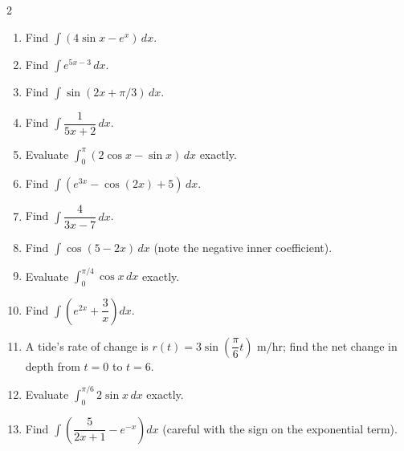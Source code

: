 \documentclass[11pt]{article}
\begin{document}
\begin{recapbox}
\begin{multicols}{2}
\small
\begin{enumerate}[leftmargin=*,itemsep=3pt]
  \item Find $\displaystyle\int(4\sin x-e^x)\,dx$.
  \item Find $\displaystyle\int e^{5x-3}\,dx$.
  \item Find $\displaystyle\int\sin(2x+\pi/3)\,dx$.
  \item Find $\displaystyle\int\dfrac{1}{5x+2}\,dx$.
  \item Evaluate $\displaystyle\int_0^{\pi}(2\cos x-\sin x)\,dx$ exactly.
  \item Find $\displaystyle\int(e^{3x}-\cos(2x)+5)\,dx$.
  \item Find $\displaystyle\int\dfrac{4}{3x-7}\,dx$.
  \item Find $\displaystyle\int\cos(5-2x)\,dx$ (note the negative inner coefficient).
  \item Evaluate $\displaystyle\int_0^{\pi/4}\cos x\,dx$ exactly.
  \item Find $\displaystyle\int\left(e^{2x}+\dfrac{3}{x}\right)dx$.
  \item A tide's rate of change is $r(t)=3\sin\!\left(\dfrac{\pi}6t\right)$ m/hr; find the net change in depth from $t=0$ to $t=6$.
  \item Evaluate $\displaystyle\int_0^{\pi/6}2\sin x\,dx$ exactly.
  \item Find $\displaystyle\int\left(\dfrac{5}{2x+1}-e^{-x}\right)dx$ (careful with the sign on the exponential term).
\end{enumerate}
\end{multicols}
\end{recapbox}
\end{document}
